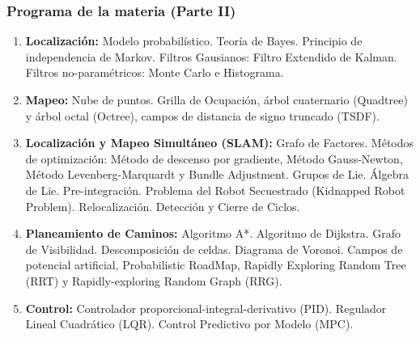 \begin{frame}
	\frametitle{Programa de la materia (Parte II)}
	\footnotesize
	\begin{enumerate}

		\item {\bf Localización:} Modelo probabilístico. Teoría de Bayes. Principio de independencia de Markov. Filtros Gausianos: Filtro Extendido de Kalman. Filtros no-paramétricos: Monte Carlo e Histograma.

		\item {\bf Mapeo:} Nube de puntos. Grilla de Ocupación, árbol cuaternario (Quadtree) y árbol octal (Octree), campos de distancia de signo truncado (TSDF).
		
		\item {\bf Localización y Mapeo Simultáneo (SLAM):} Grafo de Factores. Métodos de optimización: Método de descenso por gradiente, Método Gauss-Newton, Método Levenberg-Marquardt y Bundle Adjustment. Grupos de Lie. Álgebra de Lie. Pre-integración. Problema del Robot Secuestrado (Kidnapped Robot Problem). Relocalización. Detección y Cierre de Ciclos.
		
		\item {\bf Planeamiento de Caminos:} Algoritmo A*. Algoritmo de Dijkstra. Grafo de Visibilidad. Descomposición de celdas. Diagrama de Voronoi. Campos de potencial artificial, Probabilistic RoadMap, Rapidly Exploring Random Tree (RRT) y Rapidly-exploring Random Graph (RRG).
		
		\item {\bf Control:} Controlador proporcional-integral-derivativo (PID). Regulador Lineal Cuadrático (LQR). Control Predictivo por Modelo (MPC).
		
	\end{enumerate}

\end{frame}

